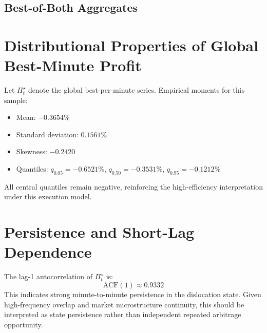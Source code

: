 \documentclass[11pt,a4paper]{article}
\begin{document}
\subsection{Best-of-Both Aggregates}
\begin{table}[H]
\centering
\caption{Best-of-both and global-best minute aggregates}
\end{table}

\section{Distributional Properties of Global Best-Minute Profit}
Let $\Pi_t^\star$ denote the global best-per-minute series. Empirical moments for this sample:
\begin{itemize}
    \item Mean: $-0.3654\%$
    \item Standard deviation: $0.1561\%$
    \item Skewness: $-0.2420$
    \item Quantiles: $q_{0.05}=-0.6521\%$, $q_{0.50}=-0.3531\%$, $q_{0.95}=-0.1212\%$
\end{itemize}
All central quantiles remain negative, reinforcing the high-efficiency interpretation under this execution model.

\section{Persistence and Short-Lag Dependence}
The lag-1 autocorrelation of $\Pi_t^\star$ is:
\begin{equation}
\mathrm{ACF}(1) \approx 0.9332
\end{equation}
This indicates strong minute-to-minute persistence in the dislocation state. Given high-frequency overlap and market microstructure continuity, this should be interpreted as state persistence rather than independent repeated arbitrage opportunity.
\end{document}

